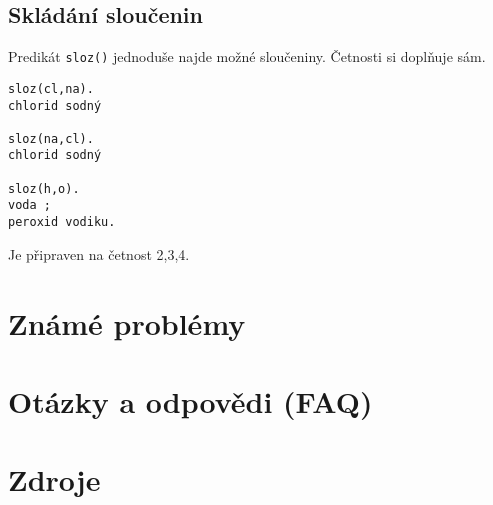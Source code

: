 \documentclass[a4paper]{article}
\begin{document}
\subsection{Skládání sloučenin}
Predikát \texttt{sloz()} jednoduše najde možné sloučeniny. Četnosti si doplňuje sám. 
\begin{verbatim}
sloz(cl,na).
chlorid sodný

sloz(na,cl).
chlorid sodný

sloz(h,o).
voda ;
peroxid vodiku.
\end{verbatim}
Je připraven na četnost 2,3,4.
\section{Známé problémy}
\section{Otázky a odpovědi (FAQ)}
\section{Zdroje}
\end{document}
